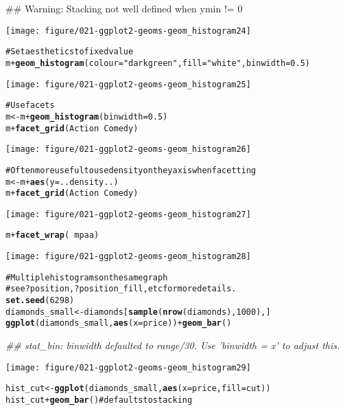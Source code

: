 \documentclass[a4paper,titlepage]{tufte-handout}\usepackage{graphicx, color}
\makeatletter
\def\maxwidth{ %
  \ifdim\Gin@nat@width>\linewidth
    \linewidth
  \else
    \Gin@nat@width
  \fi
}
\newcommand{\hlfunctioncall}[1]{\textcolor[rgb]{0.501960784313725,0,0.329411764705882}{\textbf{#1}}}%
\newcommand{\hlstring}[1]{\textcolor[rgb]{0.6,0.6,1}{#1}}%
\newcommand{\hlcomment}[1]{\textcolor[rgb]{0.180392156862745,0.6,0.341176470588235}{#1}}%
\newenvironment{kframe}{%
 \def\at@end@of@kframe{}%
 \ifinner\ifhmode%
  \def\at@end@of@kframe{\end{minipage}}%
  \begin{minipage}{\columnwidth}%
 \fi\fi%
 \def\FrameCommand##1{\hskip\@totalleftmargin \hskip-\fboxsep
 \colorbox{shadecolor}{##1}\hskip-\fboxsep
     \hskip-\linewidth \hskip-\@totalleftmargin \hskip\columnwidth}%
 \MakeFramed {\advance\hsize-\width
   \@totalleftmargin\z@ \linewidth\hsize
   \@setminipage}}%
 {\par\unskip\endMakeFramed%
 \at@end@of@kframe}
\newenvironment{knitrout}{}{} %
\makeatother
\begin{document}
\begin{knitrout}
\begin{kframe}
{\ttfamily\noindent\textcolor{warningcolor}{\#\# Warning: Stacking not well defined when ymin != 0}}\end{kframe}\texttt{[image: figure/021-ggplot2-geoms-geom\_histogram24]} \begin{kframe}\begin{alltt}
\hlcomment{# Set aesthetics to fixed value}
m + \hlfunctioncall{geom_histogram}(colour = \hlstring{"darkgreen"}, fill = \hlstring{"white"}, binwidth = 0.5)
\end{alltt}
\end{kframe}\texttt{[image: figure/021-ggplot2-geoms-geom\_histogram25]} \begin{kframe}\begin{alltt}
\hlcomment{# Use facets}
m <- m + \hlfunctioncall{geom_histogram}(binwidth = 0.5)
m + \hlfunctioncall{facet_grid}(Action ~ Comedy)
\end{alltt}
\end{kframe}\texttt{[image: figure/021-ggplot2-geoms-geom\_histogram26]} \begin{kframe}\begin{alltt}
\hlcomment{# Often more useful to use density on the y axis when facetting}
m <- m + \hlfunctioncall{aes}(y = ..density..)
m + \hlfunctioncall{facet_grid}(Action ~ Comedy)
\end{alltt}
\end{kframe}\texttt{[image: figure/021-ggplot2-geoms-geom\_histogram27]} \begin{kframe}\begin{alltt}
m + \hlfunctioncall{facet_wrap}(~ mpaa)
\end{alltt}
\end{kframe}\texttt{[image: figure/021-ggplot2-geoms-geom\_histogram28]} \begin{kframe}\begin{alltt}
\hlcomment{# Multiple histograms on the same graph}
\hlcomment{# see ?position, ?position_fill, etc for more details.}
\hlfunctioncall{set.seed}(6298)
diamonds_small <- diamonds[\hlfunctioncall{sample}(\hlfunctioncall{nrow}(diamonds), 1000), ]
\hlfunctioncall{ggplot}(diamonds_small, \hlfunctioncall{aes}(x=price)) + \hlfunctioncall{geom_bar}()
\end{alltt}


{\ttfamily\noindent\itshape\textcolor{messagecolor}{\#\# stat\_bin: binwidth defaulted to range/30. Use 'binwidth = x' to adjust this.}}\end{kframe}\texttt{[image: figure/021-ggplot2-geoms-geom\_histogram29]} \begin{kframe}\begin{alltt}
hist_cut <- \hlfunctioncall{ggplot}(diamonds_small, \hlfunctioncall{aes}(x=price, fill=cut))
hist_cut + \hlfunctioncall{geom_bar}() \hlcomment{# defaults to stacking}
\end{alltt}



\end{kframe}
\end{knitrout}
\end{document}

